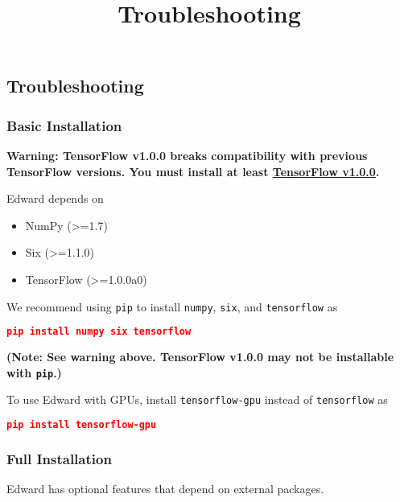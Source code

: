 \title{Troubleshooting}

\subsection{Troubleshooting}

\subsubsection{Basic Installation}

\textbf{Warning: TensorFlow v1.0.0 breaks
compatibility with previous TensorFlow versions. You must install at least
\href{https://www.tensorflow.org/versions/r1.0/get_started/os_setup}{TensorFlow v1.0.0}.
}

Edward depends on

\begin{itemize}
  \item NumPy (>=1.7)
  \item Six (>=1.1.0)
  \item TensorFlow (>=1.0.0a0)
\end{itemize}

We recommend using \texttt{pip} to install \texttt{numpy},
\texttt{six}, and \texttt{tensorflow} as

\begin{lstlisting}[language=JSON]
pip install numpy six tensorflow
\end{lstlisting}

\textbf{(Note: See warning above. TensorFlow v1.0.0 may not be installable with
\texttt{pip}.)}

To use Edward with GPUs, install \texttt{tensorflow-gpu} instead of
\texttt{tensorflow} as

\begin{lstlisting}[language=JSON]
pip install tensorflow-gpu
\end{lstlisting}

\subsubsection{Full Installation}

Edward has optional features that depend on external packages.

